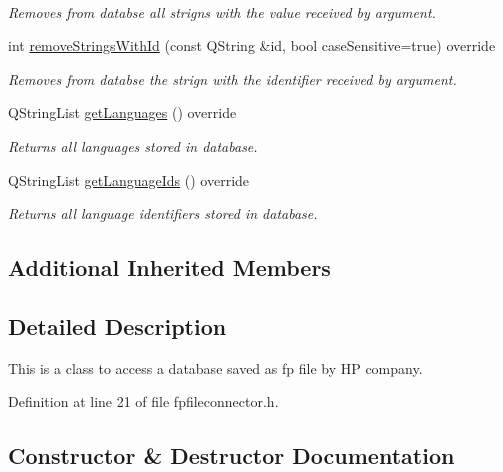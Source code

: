 \begin{DoxyCompactItemize}
$$\begin{DoxyCompactList}\small\item\em Removes from databse all strigns with the value received by argument. \end{DoxyCompactList}\item 
int \mbox{\hyperlink{classFpFileConnector_a8e09804b3c21f6b56dcc70659bbf105f}{remove\+Strings\+With\+Id}} (const Q\+String \&id, bool case\+Sensitive=true) override
\begin{DoxyCompactList}\small\item\em Removes from databse the strign with the identifier received by argument. \end{DoxyCompactList}\item 
Q\+String\+List \mbox{\hyperlink{classFpFileConnector_a82b6ae6887737cfea3b982cb0874424e}{get\+Languages}} () override
\begin{DoxyCompactList}\small\item\em Returns all languages stored in database. \end{DoxyCompactList}\item 
Q\+String\+List \mbox{\hyperlink{classFpFileConnector_a290016844ec3093b1c58db33fc86cd0a}{get\+Language\+Ids}} () override
\begin{DoxyCompactList}\small\item\em Returns all language identifiers stored in database. \end{DoxyCompactList}\end{DoxyCompactItemize}
\subsection*{Additional Inherited Members}


\subsection{Detailed Description}
This is a class to access a database saved as fp file by HP company. 

Definition at line 21 of file fpfileconnector.\+h.



\subsection{Constructor \& Destructor Documentation}
\mbox{\label{classFpFileConnector_a51b38b735ab4728601aef295d7b4c21f}} 

